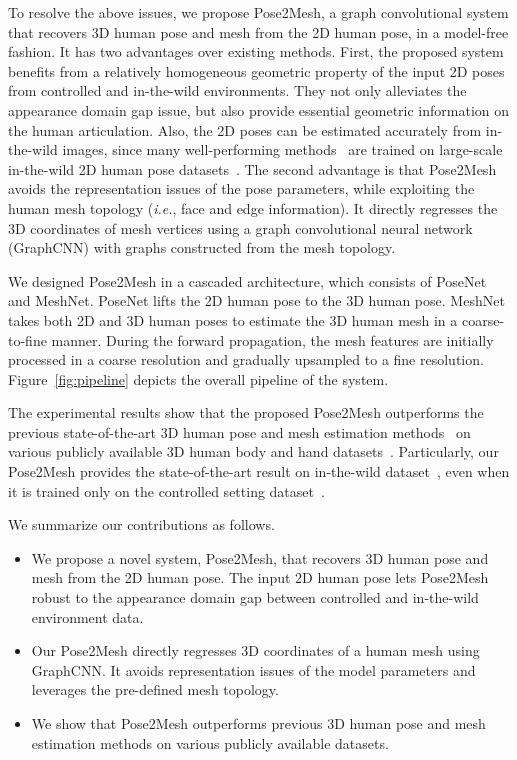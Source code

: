 \documentclass[runningheads]{llncs}
\begin{document}
To resolve the above issues, we propose Pose2Mesh, a graph convolutional system that recovers 3D human pose and mesh from the 2D human pose, in a model-free fashion.
It has two advantages over existing methods.
First, the proposed system benefits from a relatively homogeneous geometric property of the input 2D poses from controlled and in-the-wild environments.
They not only alleviates the appearance domain gap issue, but also provide essential geometric information on the human articulation.
Also, the 2D poses can be estimated accurately from in-the-wild images, since many well-performing methods~\cite{chen2018cpn,xiao2018simple,Moon_2019_CVPR_PoseFix,sun2019deep} are trained on large-scale in-the-wild 2D human pose datasets~\cite{lin2014mscoco,andriluka2018posetrack}.
The second advantage is that Pose2Mesh avoids the representation issues of the pose parameters, while exploiting the human mesh topology (\textit{i.e.}, face and edge information).
It directly regresses the 3D coordinates of mesh vertices using a graph convolutional neural network (GraphCNN) with graphs constructed from the mesh topology.

We designed Pose2Mesh in a cascaded architecture, which consists of PoseNet and MeshNet.
PoseNet lifts the 2D human pose to the 3D human pose.
MeshNet takes both 2D and 3D human poses to estimate the 3D human mesh in a coarse-to-fine manner.
During the forward propagation, the mesh features are initially processed in a coarse resolution and gradually upsampled to a fine resolution.
Figure~\ref{fig:pipeline} depicts the overall pipeline of the system.

The experimental results show that the proposed Pose2Mesh outperforms the previous state-of-the-art 3D human pose and mesh estimation methods~\cite{kolotouros2019spin,kanazawa2018hmr,kolotouros2019cmr} on various publicly available 3D human body and hand datasets~\cite{von20183dpw,ionescu2014human3,chris2019Freihand}.
Particularly, our Pose2Mesh provides the state-of-the-art result on in-the-wild dataset~\cite{von20183dpw}, even when it is trained only on the controlled setting dataset~\cite{ionescu2014human3}.

We summarize our contributions as follows. 
    \begin{itemize}
        \item We propose a novel system, Pose2Mesh, that recovers 3D human pose and mesh from the 2D human pose.
        The input 2D human pose lets Pose2Mesh robust to the appearance domain gap between controlled and in-the-wild environment data.

        \item Our Pose2Mesh directly regresses 3D coordinates of a human mesh using GraphCNN.
        It avoids representation issues of the model parameters and leverages the pre-defined mesh topology.
        
        \item We show that Pose2Mesh outperforms previous 3D human pose and mesh estimation methods on various publicly available datasets.
    \end{itemize}
\end{document}

